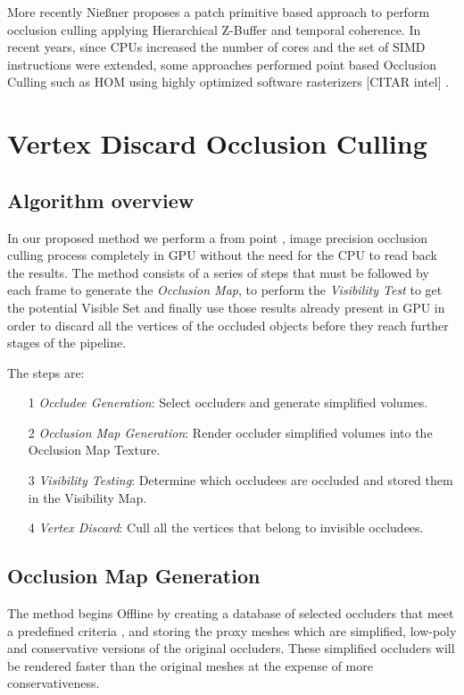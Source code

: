 \documentclass[10pt, conference]{IEEEtran}
\begin{document}
More recently Nie{\ss}ner \cite{occlusion_culling_tessellation} proposes a patch primitive based approach to perform occlusion culling applying Hierarchical Z-Buffer and temporal coherence. 
In recent years, since CPUs increased the number of cores and the set of SIMD instructions were extended, some approaches performed point based Occlusion 
Culling such as HOM using highly optimized software rasterizers \cite{killzone_3} \cite{frostbite} [CITAR intel] \cite{cacic_occlusion_2}.


\section{Vertex Discard Occlusion Culling}
%

\subsection{Algorithm overview}
%
In our proposed method we perform a from point , image precision \cite{survey_visibility} occlusion culling process completely in GPU without the need for the CPU to read back the results. 
The method consists of a series of steps that must be followed by each frame to generate the \emph{Occlusion Map}, to perform the \emph{Visibility Test} to 
get the potential Visible Set and finally use those results already present in GPU in order to discard  all the vertices of the occluded objects before they reach further stages of the pipeline.\

The steps are:
\begin{itemize}
	\item[1] \emph{Occludee Generation}: Select occluders and generate simplified volumes.
	\item[2] \emph{Occlusion Map Generation}: Render occluder simplified volumes into the Occlusion Map Texture.
	\item[3] \emph{Visibility Testing}: Determine which occludees are occluded and stored them in the Visibility Map.
	\item[4] \emph{Vertex Discard}: Cull all the vertices that belong to invisible occludees.
\end{itemize}


\subsection{Occlusion Map Generation}
%
The method begins Offline by creating a database of selected occluders that meet a predefined criteria \cite{cacic_occlusion_1}, 
and storing the proxy meshes which are simplified, low-poly and conservative versions of the original occluders. 
These simplified occluders will be rendered faster than the original meshes at the expense of more conservativeness.\
\end{document}
